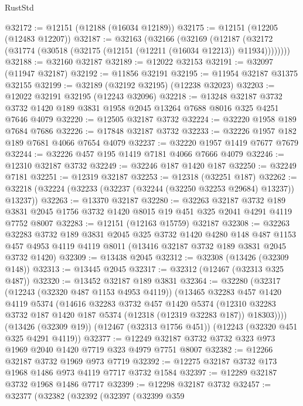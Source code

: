 \begin{lexlean}{RustStd}
\begin{coremodule}
@32172 := @12151 (@12188 (@16034 @12189))
@32175 := @12151 (@12205 (@12483 @12207))
@32187 := @32163
    (@32166
      (@32169
        (@12187 (@32172 (@31774 (@30518 (@32175 (@12151 (@12211 (@16034 @12213)) @11934))))))))
@32188 := @32160 @32187
@32189 := @12022 @32153
@32191 := @32097 (@11947 @32187)
@32192 := @11856 @32191
@32195 := @11954 @32187 @31375 @32155
@32199 := @32189 (@32192 @32195) (@12238 @32023)
@32203 := @12022 @32191 @32195 (@12243 @32096)
@32218 := @13248
    @32187
    @3732
    @3732
    @1420
    @189
    @3831
    @1958
    @2045
    @13264
    @7688
    @8016
    @325
    @4251
    @7646
    @4079
@32220 := @12505 @32187 @3732
@32224 := @32220 @1958 @189 @7684 @7686
@32226 := @17848 @32187 @3732
@32233 := @32226 @1957 @182 @189 @7681 @4066 @7654 @4079
@32237 := @32220 @1957 @1419 @7677 @7679
@32244 := @32226 @457 @195 @1419 @7181 @4066 @7666 @4079
@32246 := @12310 @32187 @3732
@32249 := @32246 @187 @1420 @187
@32250 := @32249 @7181
@32251 := @12319 @32187
@32253 := @12318 (@32251 @187)
@32262 := @32218 (@32224 (@32233 (@32237 (@32244 (@32250 @32253 @29684) @13237)) @13237))
@32263 := @13370 @32187
@32280 := @32263
    @32187
    @3732
    @189
    @3831
    @2045
    @1756
    @3732
    @1420
    @8015
    @19
    @451
    @325
    @2041
    @4291
    @4119
    @7752
    @8007
@32283 := @12151 (@12163 @15759) @32187
@32308 := @32263
    @32283
    @3732
    @189
    @3831
    @2045
    @325
    @3732
    @1420
    @4280
    @148
    @487
    @1153
    @457
    @4953
    @4119
    @4119
    @8011
    (@13416 @32187 @3732 @189 @3831 @2045 @3732 @1420)
@32309 := @13438 @2045
@32312 := @32308 (@13426 (@32309 @148))
@32313 := @13445 @2045
@32317 := @32312 (@12467 (@32313 @325 @487))
@32320 := @13452 @32187 @189 @3831
@32364 := @32280
    (@32317
      (@12243 (@32320 @487 @1153 @4953 @4119))
      (@13465
        @32283
        @457
        @1420
        @4119
        @5374
        (@14616
          @32283
          @3732
          @457
          @1420
          @5374
          (@12310 @32283 @3732 @187 @1420 @187 @5374 (@12318 (@12319 @32283 @187)) @18303))))
    (@13426 (@32309 @19))
    (@12467 (@32313 @1756 @451))
    (@12243 (@32320 @451 @325 @4291 @4119))
@32377 := @12249 @32187 @3732 @3732 @323 @973 @1969 @2040 @1420 @7719 @323 @4979 @7751 @8007
@32382 := @12266 @32187 @3732 @1969 @973 @7719
@32392 := @12275 @32187 @3732 @173 @1968 @1486 @973 @4119 @7717 @3732 @1584
@32397 := @12289 @32187 @3732 @1968 @1486 @7717
@32399 := @12298 @32187 @3732
@32457 := @32377
    (@32382
      (@32392
        (@32397
          (@32399
            @359

\end{coremodule}
\end{lexlean}

